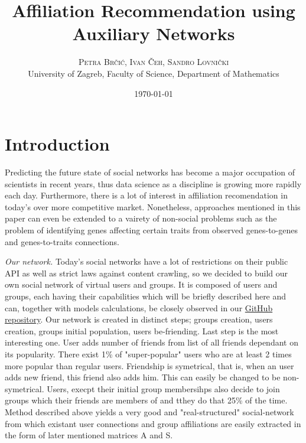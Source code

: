 \documentclass[twoside,twocolumn]{article}
\title{Affiliation Recommendation using Auxiliary Networks} %
\author{%
\textsc{Petra Brčić, Ivan Čeh, Sandro Lovnički}\\[1ex]%
\normalsize University of Zagreb, Faculty of Science, Department of Mathematics \\ %
}
\date{\today} %
\begin{document}
\maketitle


\section{Introduction}

Predicting the future state of social networks has become a major occupation of scientists in recent years, thus data science as a discipline is growing more rapidly each day. Furthermore, there is a lot of interest in affiliation recomendation in today's over more competitive market. Nonetheless, approaches mentioned in this paper can even be extended to a vairety of non-social problems such as the problem of identifying genes affecting certain traits from observed genes-to-genes and genes-to-traits connections.

{\large\textit{Our network.}} Today's social networks have a lot of restrictions on their public API as well as strict laws against content crawling, so we decided to build our own social network of virtual users and groups. It is composed of users and groups, each having their capabilities which will be briefly described here and can, together with models calculations, be closely observed in our \href{https://github.com/Qkvad/AffiliationRecommendation}{GitHub repository}. Our network is created in distinct steps; groups creation, users creation, groups initial population, users be-friending. Last step is the most interesting one. User adds number of friends from list of all friends dependant on its popularity. There exist 1\% of "super-popular" users who are at least 2 times more popular than regular users. Friendship is symetrical, that is, when an user adds new friend, this friend also adds him. This can easily be changed to be non-symetrical. Users, execpt their initial group membersihps also decide to join groups which their friends are members of and tthey do that 25\% of the time.\\
Method described above yields a very good and "real-structured" social-network from which existant user connections and group affiliations are easily extracted in the form of later mentioned matrices A and S.
\end{document}

